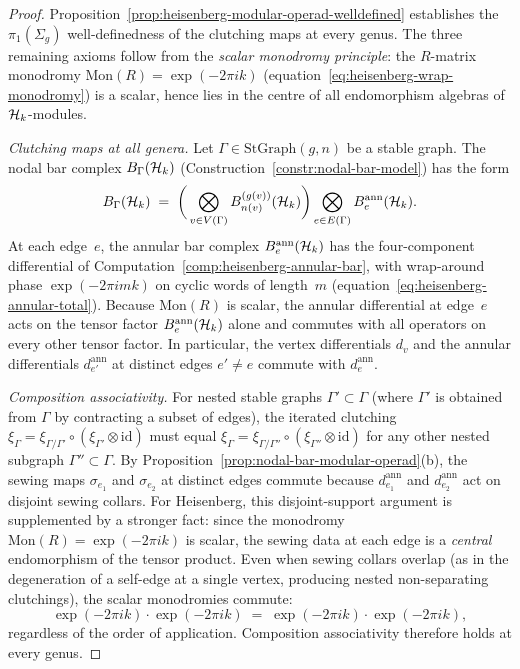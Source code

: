 \begin{proof}
Proposition~\ref{prop:heisenberg-modular-operad-welldefined}
establishes the $\pi_1(\Sigma_g)$ well-definedness of the
clutching maps at every genus. The three remaining axioms
follow from the \emph{scalar monodromy principle}: the
$R$-matrix monodromy
$\mathrm{Mon}(R) = \exp(-2\pi ik)$
\textup{(}equation~\eqref{eq:heisenberg-wrap-monodromy}\textup{)}
is a scalar, hence lies in the centre of all endomorphism
algebras of $\mathcal{H}_k$-modules.

\medskip\noindent
\emph{Clutching maps at all genera.}
Let $\Gamma \in \mathrm{StGraph}(g,n)$ be a stable graph.
The nodal bar complex
$B_\Gamma(\mathcal{H}_k)$
\textup{(}Construction~\textup{\ref{constr:nodal-bar-model}}\textup{)}
has the form
\[
 B_\Gamma(\mathcal{H}_k)
 \;=\;
 \biggl(\,
 \bigotimes_{v \in V(\Gamma)}
 B^{(g(v))}_{n(v)}(\mathcal{H}_k)
 \biggr)
 \bigotimes_{e \in E(\Gamma)}
 B^{\mathrm{ann}}_e(\mathcal{H}_k).
\]
At each edge~$e$, the annular bar complex
$B^{\mathrm{ann}}_e(\mathcal{H}_k)$ has the four-component
differential of
Computation~\ref{comp:heisenberg-annular-bar}, with
wrap-around phase $\exp(-2\pi imk)$ on cyclic words
of length~$m$
\textup{(}equation~\eqref{eq:heisenberg-annular-total}\textup{)}.
Because $\mathrm{Mon}(R)$ is scalar, the annular
differential at edge~$e$ acts on the tensor factor
$B^{\mathrm{ann}}_e(\mathcal{H}_k)$ alone and commutes with
all operators on every other tensor factor. In
particular, the vertex differentials $d_v$ and the
annular differentials $d^{\mathrm{ann}}_{e'}$ at
distinct edges $e' \ne e$ commute with
$d^{\mathrm{ann}}_e$.

\medskip\noindent
\emph{Composition associativity.}
For nested stable graphs
$\Gamma' \subset \Gamma$ (where $\Gamma'$ is obtained
from $\Gamma$ by contracting a subset of edges), the
iterated clutching
$\xi_\Gamma = \xi_{\Gamma/\Gamma'} \circ
(\xi_{\Gamma'} \otimes \mathrm{id})$
must equal
$\xi_\Gamma = \xi_{\Gamma/\Gamma''} \circ
(\xi_{\Gamma''} \otimes \mathrm{id})$
for any other nested subgraph
$\Gamma'' \subset \Gamma$. By
Proposition~\ref{prop:nodal-bar-modular-operad}(b),
the sewing maps $\sigma_{e_1}$ and $\sigma_{e_2}$ at
distinct edges commute because
$d^{\mathrm{ann}}_{e_1}$ and $d^{\mathrm{ann}}_{e_2}$
act on disjoint sewing collars. For Heisenberg, this
disjoint-support argument is supplemented by a stronger
fact: since the monodromy $\mathrm{Mon}(R) = \exp(-2\pi ik)$
is scalar, the sewing data at each edge is a
\emph{central} endomorphism of the tensor product.
Even when sewing collars overlap
(as in the degeneration of a self-edge at a single
vertex, producing nested non-separating clutchings),
the scalar monodromies commute:
\[
 \exp(-2\pi ik)\cdot\exp(-2\pi ik)
 \;=\;
 \exp(-2\pi ik)\cdot\exp(-2\pi ik),
\]
regardless of the order of application. Composition
associativity therefore holds at every genus.


\end{proof}
